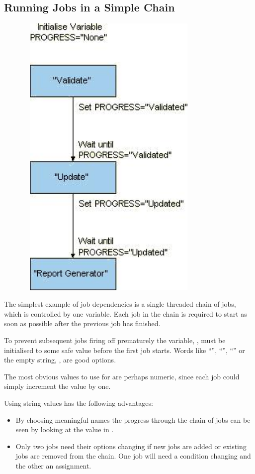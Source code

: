 \subsection{Running Jobs in a Simple Chain}

\begin{figure}
\centering
\includegraphics[width=9.019cm,height=14.168cm]{img/ref6.jpg}
\end{figure}
The simplest example of job dependencies is a single threaded chain of jobs, which is controlled by one variable. Each job in the chain is
required to start as soon as possible after the previous job has finished.

To prevent subsequent jobs firing off prematurely the variable, , must be initialised to some safe value
before the first job starts. Words like ``'', ``'', ``'' or the
empty string, {\textquotedbl}{\textquotedbl}, are good options.

The most obvious values to use for  are perhaps numeric, since each job could simply increment the value by one.

Using string values has the following advantages:

\begin{itemize}
\item By choosing meaningful names the progress through the chain of jobs can be seen by looking at the value in
.
\item Only two jobs need their options changing if new jobs are added or
existing jobs are removed from the chain. One job will need a condition
changing and the other an assignment.
\end{itemize}
